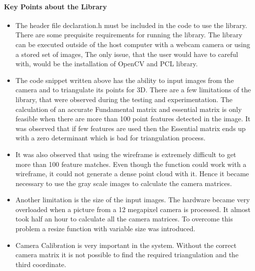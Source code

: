 \paragraph{Key Points about the Library}

\begin{itemize}
\item  The header file declaration.h must be included in the code to use the library. There are some prequisite requirements for running the library. The library can be executed outside of the host computer with a webcam camera or using a stored set of images, The only issue, that the user would have to careful with, would be the installation of OpenCV and PCL library. 

\item The code snippet written above has the ability to input images from the camera and to triangulate its points for 3D. There are a few limitations of the library, that were observed during the testing and experimentation. The calculation of an accurate Fundamental matrix and essential matrix is only feasible when there are more than 100 point features detected in the image. It was observed that if few features are used then the Essential matrix ends up with a zero determinant which is bad for triangulation process.

\item It was also observed that using the wireframe is extremely difficult to get more than 100 feature matches. Even though the function could work with a wireframe, it could not generate a dense point cloud with it. Hence it became necessary to use the gray scale images to calculate the camera matrices. 

\item Another limitation is the size of the input images. The hardware became very overloaded when a picture from a 12 megapixel camera is processed. It almost took half an hour to calculate all the camera matrices. To overcome this problem a resize function with variable size was introduced. 

\item Camera Calibration is very important in the system. Without the correct camera matrix it is not possible to find the required triangulation and the third coordinate.

\end{itemize}
